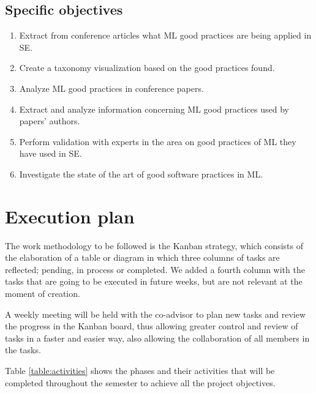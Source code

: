 \documentclass[conference]{IEEEtran}
\begin{document}
\subsection{\textbf{Specific objectives}}

\vspace{0.3cm}

\begin{enumerate}
	\item Extract from conference articles what \ac{ML} good practices are being applied in \ac{SE}.
	\vspace{0.3cm}
	\item Create a taxonomy visualization based on the good practices found.
	\vspace{0.3cm}
	\item Analyze \ac{ML} good practices in conference papers.
	\vspace{0.3cm}
	\item Extract and analyze information concerning \ac{ML} good practices used by papers' authors. 
	\vspace{0.3cm}
	\item Perform validation with experts in the area on good practices of \ac{ML} they have used in \ac{SE}.
	\vspace{0.3cm}
	\item Investigate the state of the art of good software practices in \ac{ML}.
\end{enumerate}


\section{Execution plan}

The work methodology to be followed is the Kanban strategy, which consists of the elaboration of a table or diagram in which three columns of tasks are reflected; pending, in process or completed. We added a fourth column with the tasks that are going to be executed in future weeks, but are not relevant at the moment of creation.

A weekly meeting will be held with the co-advisor to plan new tasks and review the progress in the Kanban board, thus allowing greater control and review of tasks in a faster and easier way, also allowing the collaboration of all members in the tasks.

Table \ref{table:activities} shows the phases and their activities that will be completed throughout the semester to achieve all the project objectives.
\end{document}
